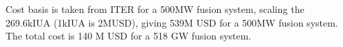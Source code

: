 Cost basis is taken from ITER for a 500MW fusion system, scaling the 269.6kIUA (1kIUA is 2MUSD), giving 539M USD for a 500MW fusion system. The total cost is 140 M USD for a 518 GW fusion system.






